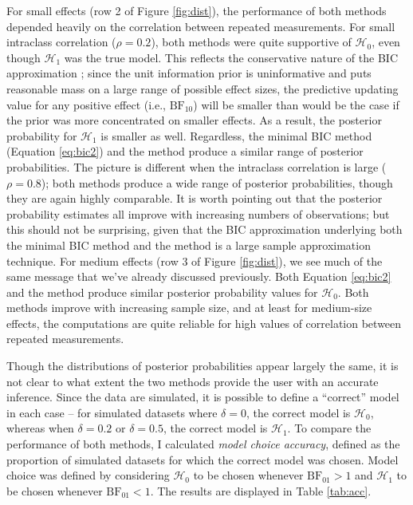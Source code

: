 \documentclass[12pt,twoside,a4paper]{article}
\begin{document}
For small effects (row 2 of Figure \ref{fig:dist}), the performance of both methods depended heavily on the correlation between repeated measurements. For small intraclass correlation ($\rho=0.2$), both methods were quite supportive of $\mathcal{H}_0$, even though $\mathcal{H}_1$ was the true model. This reflects the conservative nature of the BIC approximation \citep{wagenmakers2007}; since the unit information prior is uninformative and puts reasonable mass on a large range of possible effect sizes, the predictive updating value for any positive effect (i.e., $\text{BF}_{10}$) will be smaller than would be the case if the prior was more concentrated on smaller effects. As a result, the posterior probability for $\mathcal{H}_1$ is smaller as well. Regardless, the minimal BIC method (Equation \ref{eq:bic2}) and the \citet{nathoo2016} method produce a similar range of posterior probabilities. The picture is different when the intraclass correlation is large ($\rho=0.8$); both methods produce a wide range of posterior probabilities, though they are again highly comparable. It is worth pointing out that the posterior probability estimates all improve with increasing numbers of observations; but this should not be surprising, given that the BIC approximation underlying both the minimal BIC method and the \citet{nathoo2016} method is a large sample approximation technique. For medium effects (row 3 of Figure \ref{fig:dist}), we see much of the same message that we've already discussed previously. Both Equation \ref{eq:bic2} and the \citet{nathoo2016} method produce similar posterior probability values for $\mathcal{H}_0$. Both methods improve with increasing sample size, and at least for medium-size effects, the computations are quite reliable for high values of correlation between repeated measurements.

Though the distributions of posterior probabilities appear largely the same, it is not clear to what extent the two methods provide the user with an accurate inference. Since the data are simulated, it is possible to define a ``correct'' model in each case -- for simulated datasets where $\delta=0$, the correct model is $\mathcal{H}_0$, whereas when $\delta=0.2$ or $\delta=0.5$, the correct model is $\mathcal{H}_1$. To compare the performance of both methods, I calculated {\it model choice accuracy}, defined as the proportion of simulated datasets for which the correct model was chosen. Model choice was defined by considering $\mathcal{H}_0$ to be chosen whenever $\text{BF}_{01}>1$ and $\mathcal{H}_1$ to be chosen whenever $\text{BF}_{01}<1$. The results are displayed in Table \ref{tab:acc}.
\end{document}

